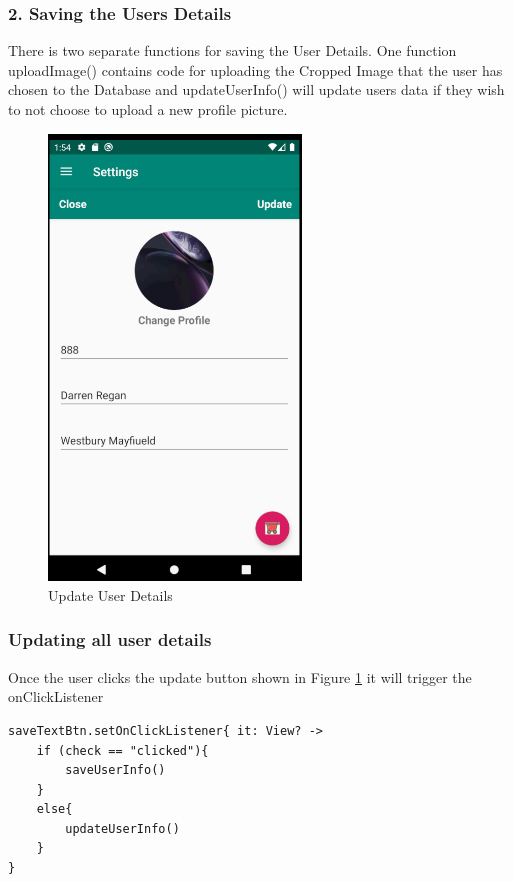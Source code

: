 \subsubsection{2. Saving the Users Details}
There is two separate functions for saving the User Details. One function uploadImage() contains code for uploading the Cropped Image that the user has chosen to the Database and updateUserInfo() will update users data if they wish to not choose to upload a new profile picture.

\begin{figure}[h!]
	\caption{Update User Details}
	\label{userdetails}
	\centering
	\includegraphics[width=0.6\textwidth]{Images/setting_updating.png}
\end{figure}
\newpage

\subsubsection{Updating all user details}
Once the user clicks the update button shown in Figure \ref{userdetails} it will trigger the onClickListener
\begin{verbatim}
saveTextBtn.setOnClickListener{ it: View? ->
    if (check == "clicked"){
        saveUserInfo()
    }
    else{
        updateUserInfo()
    }
}
\end{verbatim}

